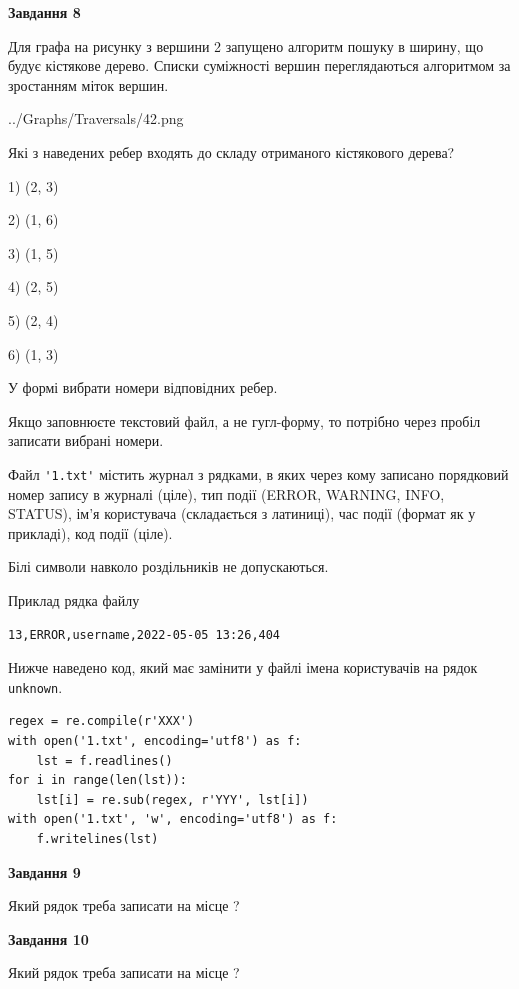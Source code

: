\documentclass[12pt, ukrainian]{article}
\def\code#1{\Verb!#1!}
\begin{document}
{\begin {large}
{\begin {center}\textbf{Завдання 8}\end {center}}\par
Для графа на рисунку з вершини 2 запущено алгоритм пошуку в ширину, що будує кістякове дерево. Списки суміжності вершин переглядаються алгоритмом за зростанням міток вершин.\par
\begin{center}
	{../Graphs/Traversals/42.png}
\end{center}
\par Які з наведених ребер входять до складу отриманого кістякового дерева?\par
1) (2, 3)\par
2) (1, 6)\par
3) (1, 5)\par
4) (2, 5)\par
5) (2, 4)\par
6) (1, 3)\par
{\vskip 15pt} У формі вибрати номери відповідних ребер.


Якщо заповнюєте текстовий файл, а не гугл-форму, то потрібно через пробіл записа\-ти вибрані номери.\par
\newpage


Файл \code{'1.txt'} містить журнал з рядками, в яких через кому записано поряд\-ко\-вий номер запису в журналі (ціле), тип події (ERROR, WARNING, INFO, STATUS), ім'я користувача (складається з латиниці), час події (фор\-мат як у прикладі), код події (ціле).

Білі символи навколо роздільників не допускаються.

Приклад рядка файлу



\begin{verbatim}
13,ERROR,username,2022-05-05 13:26,404
\end{verbatim}


Нижче наведено код, який має замінити у файлі імена користувачів на рядок \code{unknown}.



\begin{verbatim}
regex = re.compile(r'XXX')
with open('1.txt', encoding='utf8') as f:
    lst = f.readlines()
for i in range(len(lst)):
    lst[i] = re.sub(regex, r'YYY', lst[i])
with open('1.txt', 'w', encoding='utf8') as f:
    f.writelines(lst)
\end{verbatim}




{\begin {center}\textbf{Завдання 9}\end {center}}\par
Який рядок треба записати на місце  ?\par
\vspace{5mm}


{\begin {center}\textbf{Завдання 10}\end {center}}\par
Який рядок треба записати на місце  ?\par


\newpage


\end {large}}
\end{document}
